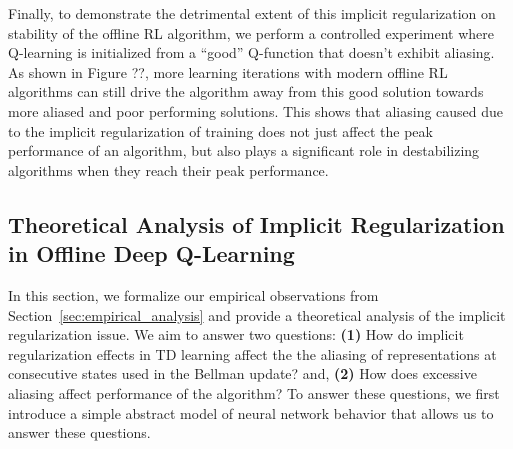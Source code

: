
Finally, to demonstrate the detrimental extent of this implicit regularization on stability of the offline RL algorithm, we perform a controlled experiment where Q-learning is initialized from a ``good'' Q-function that doesn't exhibit aliasing.
As shown in Figure ??,
more learning iterations with modern offline RL algorithms can still drive the algorithm away from this good solution towards more aliased and poor performing solutions. This shows that aliasing caused due to the implicit regularization of training does not just affect the peak performance of an algorithm, but also plays a significant role in destabilizing algorithms when they reach their peak performance.  

\subsection{Theoretical Analysis of Implicit Regularization in Offline Deep Q-Learning}
\label{sec:theory_evidence}
In this section, we formalize our empirical observations from Section~\ref{sec:empirical_analysis} and provide a theoretical analysis of the implicit regularization issue. We aim to answer two questions: \textbf{(1)} How do implicit regularization effects in TD learning affect the the aliasing of representations at consecutive states used in the Bellman update? and, \textbf{(2)} How does excessive aliasing affect performance of the algorithm? To answer these questions, we first introduce a simple abstract model of neural network behavior
that allows us to answer these questions.

